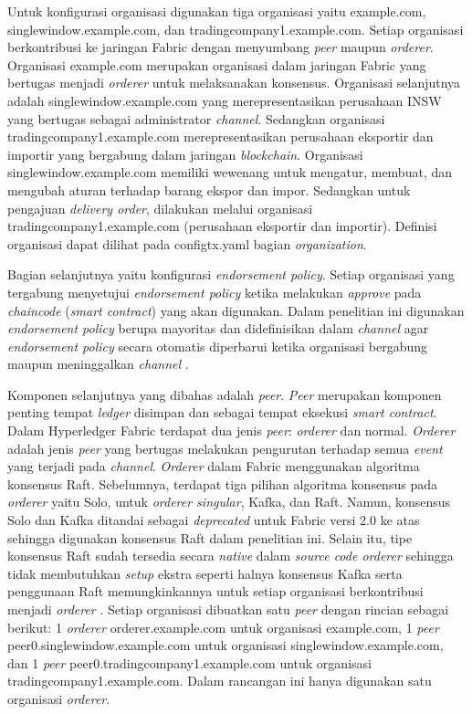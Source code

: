 Untuk konfigurasi organisasi digunakan tiga organisasi yaitu example.com, singlewindow.example.com, dan tradingcompany1.example.com. Setiap organisasi berkontribusi ke jaringan Fabric dengan menyumbang \textit{peer} maupun \textit{orderer}. Organisasi example.com merupakan organisasi dalam jaringan Fabric yang bertugas menjadi \textit{orderer} untuk melaksanakan konsensus. Organisasi selanjutnya adalah singlewindow.example.com yang merepresentasikan perusahaan INSW yang bertugas sebagai administrator \textit{channel}. Sedangkan organisasi tradingcompany1.example.com merepresentasikan perusahaan eksportir dan importir yang bergabung dalam jaringan \textit{blockchain}. Organisasi singlewindow.example.com memiliki wewenang untuk mengatur, membuat, dan mengubah aturan terhadap barang ekspor dan impor.  Sedangkan untuk pengajuan \textit{delivery order}, dilakukan melalui organisasi tradingcompany1.example.com (perusahaan eksportir dan importir). Definisi organisasi dapat dilihat pada configtx.yaml bagian \textit{organization}.


Bagian selanjutnya yaitu konfigurasi \textit{endorsement policy}. Setiap organisasi yang tergabung menyetujui \textit{endorsement policy} ketika melakukan \textit{approve} pada \textit{chaincode} (\textit{smart contract}) yang akan digunakan. Dalam penelitian ini digunakan \textit{endorsement policy} berupa mayoritas dan didefinisikan dalam \textit{channel} agar \textit{endorsement policy} secara otomatis diperbarui ketika organisasi bergabung maupun meninggalkan \textit{channel} \citep{Androulaki2018}.


Komponen selanjutnya yang dibahas adalah \textit{peer}. \textit{Peer} merupakan komponen penting tempat \textit{ledger} disimpan dan sebagai tempat eksekusi \textit{smart contract}. Dalam Hyperledger Fabric terdapat dua jenis \textit{peer}: \textit{orderer} dan normal. \textit{Orderer} adalah jenis \textit{peer} yang bertugas melakukan pengurutan terhadap semua \textit{event} yang terjadi pada \textit{channel}. \textit{Orderer} dalam Fabric menggunakan algoritma konsensus Raft. Sebelumnya, terdapat tiga pilihan algoritma konsensus pada \textit{orderer} yaitu Solo, untuk \textit{orderer singular}, Kafka, dan Raft. Namun, konsensus Solo dan Kafka ditandai sebagai \textit{deprecated} untuk Fabric versi 2.0 ke atas sehingga digunakan konsensus Raft dalam penelitian ini. Selain itu, tipe konsensus Raft sudah tersedia secara \textit{native} dalam \textit{source code orderer} sehingga tidak membutuhkan \textit{setup} ekstra seperti halnya konsensus Kafka serta penggunaan Raft memungkinkannya untuk setiap organisasi berkontribusi menjadi \textit{orderer} \citep{Androulaki2018}. Setiap organisasi dibuatkan satu \textit{peer} dengan rincian sebagai berikut: 1 \textit{orderer} orderer.example.com untuk organisasi example.com, 1 \textit{peer} peer0.singlewindow.example.com untuk organisasi singlewindow.example.com, dan 1 \textit{peer} peer0.tradingcompany1.example.com untuk organisasi tradingcompany1.example.com. Dalam rancangan ini hanya digunakan satu organisasi \textit{orderer}.


